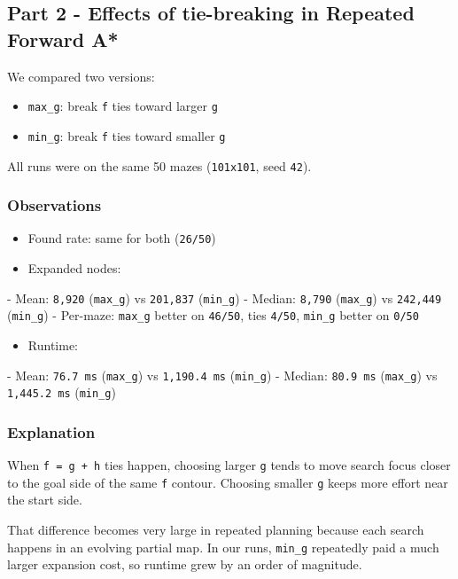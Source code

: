 \documentclass[11pt]{article}
\begin{document}
\subsection*{Part 2 - Effects of tie-breaking in Repeated Forward A*}

We compared two versions:

\begin{itemize}[leftmargin=*]
\item \texttt{max\_g}: break \texttt{f} ties toward larger \texttt{g}
\item \texttt{min\_g}: break \texttt{f} ties toward smaller \texttt{g}
\end{itemize}

All runs were on the same 50 mazes (\texttt{101x101}, seed \texttt{42}).

\subsubsection*{Observations}

\begin{itemize}[leftmargin=*]
\item Found rate: same for both (\texttt{26/50})
\item Expanded nodes:
\end{itemize}
  - Mean: \texttt{8,920} (\texttt{max\_g}) vs \texttt{201,837} (\texttt{min\_g})
  - Median: \texttt{8,790} (\texttt{max\_g}) vs \texttt{242,449} (\texttt{min\_g})
  - Per-maze: \texttt{max\_g} better on \texttt{46/50}, ties \texttt{4/50}, \texttt{min\_g} better on \texttt{0/50}
\begin{itemize}[leftmargin=*]
\item Runtime:
\end{itemize}
  - Mean: \texttt{76.7 ms} (\texttt{max\_g}) vs \texttt{1,190.4 ms} (\texttt{min\_g})
  - Median: \texttt{80.9 ms} (\texttt{max\_g}) vs \texttt{1,445.2 ms} (\texttt{min\_g})

\subsubsection*{Explanation}

When \texttt{f = g + h} ties happen, choosing larger \texttt{g} tends to move search focus closer to the goal side of the same \texttt{f} contour. Choosing smaller \texttt{g} keeps more effort near the start side.

That difference becomes very large in repeated planning because each search happens in an evolving partial map. In our runs, \texttt{min\_g} repeatedly paid a much larger expansion cost, so runtime grew by an order of magnitude.
\end{document}
